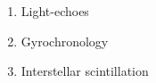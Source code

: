 \begin{enumerate}


\item Light-echoes

\item Gyrochronology

\item Interstellar scintillation



\end{enumerate}



% 





